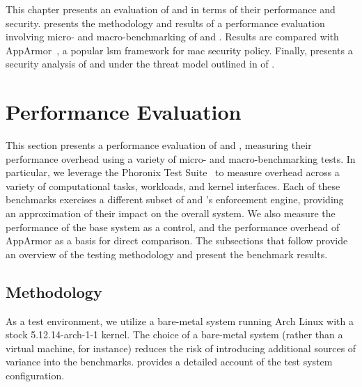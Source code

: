 This chapter presents an evaluation of \bpfbox{} and \bpfcontain{} in terms of their
performance and security.  presents the methodology and results
of a performance evaluation involving micro- and macro-benchmarking of \bpfbox{} and
\bpfcontain{}. Results are compared with AppArmor~\cite{cowan2000_apparmor}, a popular
\gls{lsm} framework for \gls{mac} security policy. Finally, 
presents a security analysis of \bpfbox{} and \bpfcontain{} under the threat model
outlined in  of .

\section{Performance Evaluation}%
\label{s:eval-performance}

This section presents a performance evaluation of \bpfbox{} and \bpfcontain{}, measuring
their performance overhead using a variety of micro- and macro-benchmarking tests. In
particular, we leverage the Phoronix Test Suite~\cite{phoronix} to measure overhead across
a variety of computational tasks, workloads, and kernel interfaces. Each of these
benchmarks exercises a different subset of \bpfbox{} and \bpfcontain{}'s enforcement
engine, providing an approximation of their impact on the overall system. We also measure
the performance of the base system as a control, and the performance overhead of AppArmor
as a basis for direct comparison. The subsections that follow provide an overview of the
testing methodology and present the benchmark results.

\subsection{Methodology}%
\label{ss:eval-methodology}

As a test environment, we utilize a bare-metal system running Arch Linux with a stock
5.12.14-arch-1-1 kernel. The choice of a bare-metal system (rather than a virtual machine,
for instance) reduces the risk of introducing additional sources of variance into the
benchmarks.  provides a detailed account of the test system
configuration.

